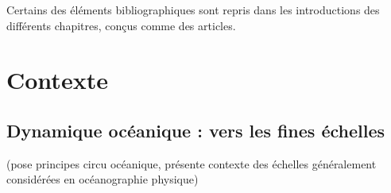 

Certains des éléments bibliographiques sont repris dans les introductions des différents chapitres, conçus comme des articles.

\section{Contexte}
\subsection{Dynamique océanique : vers les fines échelles}
(pose principes circu océanique, présente contexte des échelles généralement considérées en océanographie physique)

